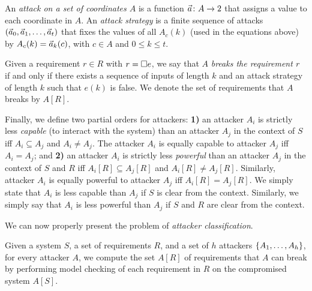 {An \emph{attack on a set of coordinates $A$} is a function $\vec{a}\colon A\rightarrow 2$ that assigns a value to each coordinate in $A$. An \emph{attack strategy} is a finite sequence of attacks $(\vec{a}_0, \vec{a}_1, \ldots, \vec{a}_t)$ that fixes the values of all $A_c(k)$ (used in the equations above) by $A_c(k)=\vec{a}_k(c)$, with $c\in A$ and $0 \leq k \leq t$. %
\begin{definition}
\label{def:brokenRequirement}
Given a requirement $r\in R$ with $r={{\square}} e$, we say that $A$ \emph{breaks the requirement $r$} if and only if there exists a sequence of inputs of length $k$ and an attack strategy of length $k$ such that $e(k)$ is false. We denote the set of requirements that $A$ breaks by  $A[R]$. 
\end{definition}
Finally, we define two partial orders for attackers: \textbf{1)} an attacker $A_i$ is strictly less \emph{capable} (to interact with the system) than an attacker $A_j$ in the 
context of $S$ %
iff $A_i\subseteq A_j$ and $A_i \neq A_j$. The {attacker $A_i$ is equally capable to attacker $A_j$ iff $A_i= A_j$}; and \textbf{2)} an attacker $A_i$ is strictly less \emph{powerful} than an attacker $A_j$ in the 
context of $S$ and $R$ %
iff $A_i[R]\subseteq A_j[R]$ and $A_i[R]\neq A_j[R]$. Similarly, {attacker $A_i$ is equally powerful to attacker $A_j$ iff $A_i[R]= A_j[R]$}. We simply state that $A_i$ is less capable than $A_j$ if $S$ is clear from the context. Similarly, we simply say that $A_i$ is less powerful than $A_j$ if $S$ and $R$ are clear from the context.

We can now properly present the problem of \emph{attacker classification}.
\begin{definition} 
\label{def:AttackerQuantification}
Given a system $S$, a set of requirements $R$, and a set of $h$ attackers 
$\left\{A_1, \ldots , A_h\right\}$, for every attacker $A$, we compute the set $A[R]$ of requirements that $A$ can break by performing model checking of each requirement in $R$ on the compromised system $A[S]$. 
\end{definition}

}
